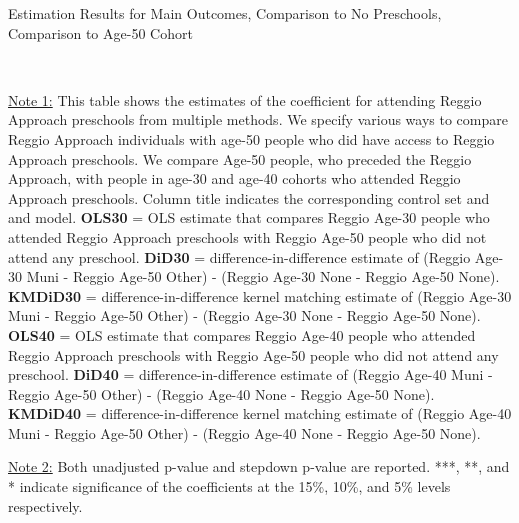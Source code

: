 \begin{table}[H] \caption{Estimation Results for Main Outcomes, Comparison to No Preschools, Comparison to Age-50 Cohort} \label{ols-M-adult50-reg-nopres}
\scalebox{0.56}{}
\vspace{1ex} \\
\footnotesize\raggedright{\underline{Note 1:} This table shows the estimates of the coefficient for attending Reggio Approach preschools from multiple methods. We specify various ways to compare Reggio Approach individuals with age-50 people who did have access to Reggio Approach preschools. We compare Age-50 people, who preceded the Reggio Approach, with people in age-30 and age-40 cohorts who attended Reggio Approach preschools. Column title indicates the corresponding control set and and model. \textbf{OLS30} = OLS estimate that compares Reggio Age-30 people who attended Reggio Approach preschools with Reggio Age-50 people who did not attend any preschool.  \textbf{DiD30} = difference-in-difference estimate of (Reggio Age-30 Muni - Reggio Age-50 Other) - (Reggio Age-30 None - Reggio Age-50 None). \textbf{KMDiD30} = difference-in-difference kernel matching estimate of (Reggio Age-30 Muni - Reggio Age-50 Other) - (Reggio Age-30 None - Reggio Age-50 None).  \textbf{OLS40} = OLS estimate that compares Reggio Age-40 people who attended Reggio Approach preschools with Reggio Age-50 people who did not attend any preschool.  \textbf{DiD40} = difference-in-difference estimate of (Reggio Age-40 Muni - Reggio Age-50 Other) - (Reggio Age-40 None - Reggio Age-50 None). \textbf{KMDiD40} = difference-in-difference kernel matching estimate of (Reggio Age-40 Muni - Reggio Age-50 Other) - (Reggio Age-40 None - Reggio Age-50 None). }

\footnotesize\raggedright{\underline{Note 2:} Both unadjusted p-value and stepdown p-value are reported. ***, **, and * indicate significance of the coefficients at the 15\%, 10\%, and 5\% levels respectively.}
\end{table}


